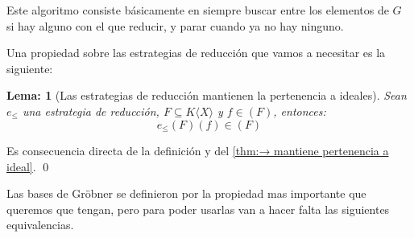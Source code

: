 \documentclass{report}
\theoremstyle{customstyle}
\newtheorem{lemma}{Lema:}[chapter]
\renewenvironment{proof}[1][\proofname]{{\bfseries #1: }}{\qed} %
\theoremstyle{factstyle}
\begin{document}
Este algoritmo consiste básicamente en siempre buscar entre los elementos de $G$ si hay alguno con el que reducir, y parar cuando ya no hay ninguno.

Una propiedad sobre las estrategias de reducción que vamos a necesitar es la siguiente:

\begin{lemma}[Las estrategias de reducción mantienen la pertenencia a ideales]\label{lemma:e mantiene pertenencia a ideal}
  Sean $e_≤$ una estrategia de reducción, $F ⊆ K⟨X⟩$ y $f ∈ (F)$, entonces:
  \[ e_≤(F)(f) ∈ (F) \]
\end{lemma}
\begin{proof}
  Es consecuencia directa de la definición y del \cref{thm:→ mantiene pertenencia a ideal}.
\end{proof}

Las bases de Gröbner se definieron por la propiedad mas importante que queremos que tengan, pero para poder usarlas van a hacer falta las siguientes equivalencias.
\end{document}
